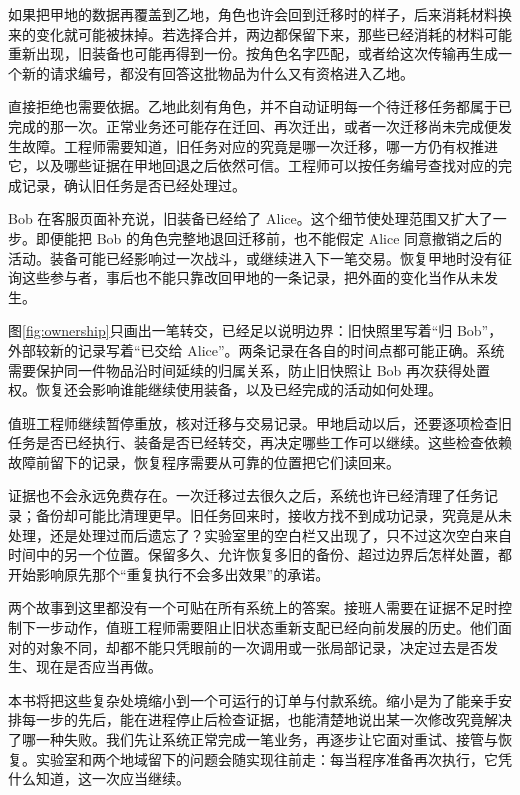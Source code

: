 

如果把甲地的数据再覆盖到乙地，角色也许会回到迁移时的样子，后来消耗材料换来的变化就可能被抹掉。若选择合并，两边都保留下来，那些已经消耗的材料可能重新出现，旧装备也可能再得到一份。按角色名字匹配，或者给这次传输再生成一个新的请求编号，都没有回答这批物品为什么又有资格进入乙地。

直接拒绝也需要依据。乙地此刻有角色，并不自动证明每一个待迁移任务都属于已完成的那一次。正常业务还可能存在迁回、再次迁出，或者一次迁移尚未完成便发生故障。工程师需要知道，旧任务对应的究竟是哪一次迁移，哪一方仍有权推进它，以及哪些证据在甲地回退之后依然可信。工程师可以按任务编号查找对应的完成记录，确认旧任务是否已经处理过。

Bob 在客服页面补充说，旧装备已经给了 Alice。这个细节使处理范围又扩大了一步。即便能把 Bob 的角色完整地退回迁移前，也不能假定 Alice 同意撤销之后的活动。装备可能已经影响过一次战斗，或继续进入下一笔交易。恢复甲地时没有征询这些参与者，事后也不能只靠改回甲地的一条记录，把外面的变化当作从未发生。



图\ref{fig:ownership}只画出一笔转交，已经足以说明边界：旧快照里写着“归 Bob”，外部较新的记录写着“已交给 Alice”。两条记录在各自的时间点都可能正确。系统需要保护同一件物品沿时间延续的归属关系，防止旧快照让 Bob 再次获得处置权。恢复还会影响谁能继续使用装备，以及已经完成的活动如何处理。

值班工程师继续暂停重放，核对迁移与交易记录。甲地启动以后，还要逐项检查旧任务是否已经执行、装备是否已经转交，再决定哪些工作可以继续。这些检查依赖故障前留下的记录，恢复程序需要从可靠的位置把它们读回来。

证据也不会永远免费存在。一次迁移过去很久之后，系统也许已经清理了任务记录；备份却可能比清理更早。旧任务回来时，接收方找不到成功记录，究竟是从未处理，还是处理过而后遗忘了？实验室里的空白栏又出现了，只不过这次空白来自时间中的另一个位置。保留多久、允许恢复多旧的备份、超过边界后怎样处置，都开始影响原先那个“重复执行不会多出效果”的承诺。

两个故事到这里都没有一个可贴在所有系统上的答案。接班人需要在证据不足时控制下一步动作，值班工程师需要阻止旧状态重新支配已经向前发展的历史。他们面对的对象不同，却都不能只凭眼前的一次调用或一张局部记录，决定过去是否发生、现在是否应当再做。

本书将把这些复杂处境缩小到一个可运行的订单与付款系统。缩小是为了能亲手安排每一步的先后，能在进程停止后检查证据，也能清楚地说出某一次修改究竟解决了哪一种失败。我们先让系统正常完成一笔业务，再逐步让它面对重试、接管与恢复。实验室和两个地域留下的问题会随实现往前走：每当程序准备再次执行，它凭什么知道，这一次应当继续。




